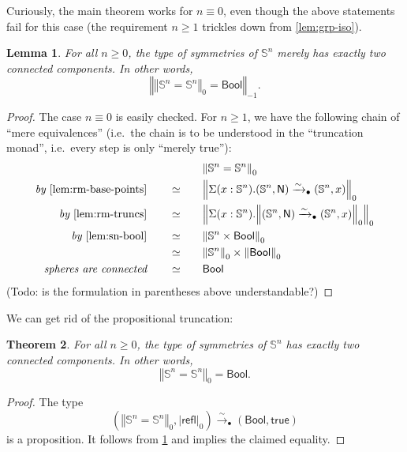 \documentclass[11pt,a4paper,oneside,reqno]{amsart}
\newtheorem{theorem}{Theorem}
\newtheorem{lemma}[theorem]{Lemma}
\theoremstyle{definition}
\theoremstyle{remark}
\newcommand{\sph}[1]{{\mathbb S}^{#1}}
\newcommand{\refl}{\mathsf{refl}}
\newcommand{\trunc}[2]{\mathopen{}\left\Vert #2\right\Vert_{#1}\mathclose{}}
\newcommand{\tproj}[3][]{\mathopen{}\left|#3\right|_{#2}^{#1}\mathclose{}}
\newcommand{\North}{\mathsf N}
\begin{document}
Curiously, the main theorem works for $n \equiv 0$, even though the above statements fail for this case (the requirement $n \geq 1$ trickles down from \cref{lem:grp-iso}).
\begin{lemma} \label{lem:mainlemma}
 For all $n \geq 0$, the type of symmetries of $\sph n$ merely has exactly two connected components.
 In other words,
 \begin{equation}
  \trunc {-1} {\trunc 0 {\sph n = \sph n} = \mathsf{Bool}}.
 \end{equation}
\end{lemma}
\begin{proof}
 The case $n \equiv 0$ is easily checked.
 For $n \geq 1$, we have the following chain of ``mere equivalences'' (i.e.\ the chain is to be understood in the ``truncation monad'', i.e.\ every step is only ``merely true''):
  \begin{alignat}{5}
  &&&\trunc 0 {\sph n = \sph n} \\
  \textit{by }\cref{lem:rm-base-points} \qquad &\simeq &\quad& \trunc 0 {\Sigma(x : \sph n).(\sph n, \North) \xrightarrow{\sim}_\bullet (\sph n, x)}  \\
  \textit{by }\cref{lem:rm-truncs} \qquad &\simeq && \trunc 0 {\Sigma(x : \sph n).\trunc 0 {(\sph n, \North) \xrightarrow{\sim}_\bullet (\sph n, x)}}  \\
  \textit{by }\cref{lem:sn-bool} \qquad &\simeq && \trunc 0 {\sph n \times \mathsf{Bool}}  \\
  \textit{ } \qquad &\simeq && \trunc 0 {\sph n} \times \trunc 0 {\mathsf{Bool}}    \\
  \textit{spheres are connected} \qquad &\simeq && \mathsf{Bool}
 \end{alignat}
(Todo: is the formulation in parentheses above understandable?)
\end{proof}

We can get rid of the propositional truncation:
\begin{theorem} \label{thm:symmetries-two-components}
 For all $n \geq 0$, the type of symmetries of $\sph n$ has exactly two connected components.
 In other words,
 \begin{equation}
  \trunc 0 {\sph n = \sph n} = \mathsf{Bool}.
 \end{equation}
\end{theorem}
\begin{proof}
 The type 
 \begin{equation}
  \left(\trunc 0 {\sph n = \sph n}, \tproj {0} \refl\right) \xrightarrow{\sim}_\bullet (\mathsf{Bool},\mathsf{true})
 \end{equation}
 is a proposition.
 It follows from \cref{lem:mainlemma} and implies the claimed equality.
\end{proof}
\end{document}
